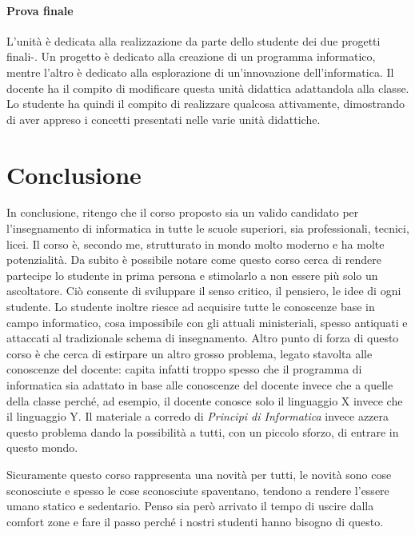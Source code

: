 \documentclass[11pt,a4paper]{article}
\begin{document}
\paragraph{Prova finale}
L'unità è dedicata alla realizzazione da parte dello studente dei due
progetti finali-. Un progetto è dedicato alla creazione di un
programma informatico, mentre l'altro è dedicato alla esplorazione di
un'innovazione dell'informatica. Il docente ha il compito di
modificare questa unità didattica adattandola alla classe. Lo studente
ha quindi il compito di realizzare qualcosa attivamente, dimostrando
di aver appreso i concetti presentati nelle varie unità didattiche.

\section{Conclusione}

In conclusione, ritengo che il corso proposto sia un valido candidato
per l'insegnamento di informatica in tutte le scuole superiori, sia 
professionali, tecnici, licei. Il corso è, secondo me, strutturato
in mondo molto moderno e ha molte potenzialità. Da subito è possibile
notare come questo corso cerca di rendere partecipe lo studente in
prima persona e stimolarlo a non essere più solo un ascoltatore. 
Ciò consente di sviluppare il senso critico, il pensiero, le idee 
di ogni studente.
Lo studente inoltre riesce ad acquisire tutte le conoscenze base in
campo informatico, cosa impossibile con gli attuali ministeriali,
spesso antiquati e attaccati al tradizionale schema di insegnamento.
Altro punto di forza di questo corso è che cerca di estirpare un 
altro grosso problema, legato stavolta alle conoscenze del docente: 
capita infatti troppo spesso che il programma di informatica sia
adattato in base alle conoscenze del docente invece che a quelle 
della classe perché, ad esempio, il docente conosce solo il 
linguaggio X invece che il linguaggio Y. Il materiale a corredo di
\emph{Principi di Informatica} invece azzera questo problema dando 
la possibilità a tutti, con un piccolo sforzo, di entrare in questo
mondo.

Sicuramente questo corso rappresenta una novità per tutti, le novità sono cose sconosciute e spesso le cose sconosciute spaventano, tendono a rendere l'essere umano statico e sedentario. Penso sia però arrivato il tempo di uscire dalla comfort zone e fare il passo perché i nostri studenti hanno bisogno di questo.
\end{document}
